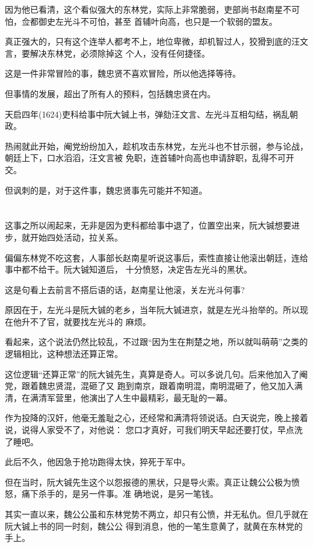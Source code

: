\documentclass[11pt,a4paper,onecolumn]{article}
\begin{document}
因为他已看清，这个看似强大的东林党，实际上非常脆弱，吏部尚书赵南星不可怕，佥都御史左光斗不可怕，甚至
首辅叶向高，也只是一个软弱的盟友。

真正强大的，只有这个连举人都考不上，地位卑微，却机智过人，狡猾到底的汪文言，要解决东林党，必须除掉这
个人，没有任何捷径。

这是一件非常冒险的事，魏忠贤不喜欢冒险，所以他选择等待。

但事情的发展，超出了所有人的预料，包括魏忠贤在内。

天启四年(1624)吏科给事中阮大铖上书，弹劾汪文言、左光斗互相勾结，祸乱朝政。

热闹就此开始，阉党纷纷加入，趁机攻击东林党，左光斗也不甘示弱，参与论战，朝廷上下，口水滔滔，汪文言被
免职，连首辅叶向高也申请辞职，乱得不可开交。

但讽刺的是，对于这件事，魏忠贤事先可能并不知道。

\section[\thesection]{}

这事之所以闹起来，无非是因为吏科都给事中退了，位置空出来，阮大铖想要进步，就开始四处活动，拉关系。

偏偏东林党不吃这套，人事部长赵南星听说这事后，索性直接让他滚出朝廷，连给事中都不给干。阮大铖知道后，
十分愤怒，决定告左光斗的黑状。

这是句看上去前言不搭后语的话，赵南星让他滚，关左光斗何事?

原因在于，左光斗是阮大铖的老乡，当年阮大铖进京，就是左光斗抬举的。所以现在他升不了官，就要找左光斗的
麻烦。

看起来，这个说法仍然比较乱，不过跟``因为生在荆楚之地，所以就叫萌萌''之类的逻辑相比，这种想法还算正常。

这位逻辑``还算正常''的阮大铖先生，真算是奇人。可以多说几句。后来他加入了阉党，跟着魏忠贤混，混砸了又
跑到南京，跟着南明混，南明混砸了，他又加入满清，在满清军营里，他演出了人生中最精彩，最无耻的一幕。

作为投降的汉奸，他毫无羞耻之心，还经常和满清将领说话。白天说完，晚上接着说，说得人家受不了，对他说：
您口才真好，可我们明天早起还要打仗，早点洗了睡吧。

此后不久，他因急于抢功跑得太快，猝死于军中。

但在当时，阮大铖先生这个以怨报德的黑状，只是导火索。真正让魏公公极为愤怒，痛下杀手的，是另一件事。准
确地说，是另一笔钱。

其实一直以来，魏公公虽和东林党势不两立，却只有公愤，并无私仇。但几乎就在阮大铖上书的同一时刻，魏公公
得到消息，他的一笔生意黄了，就黄在东林党的手上。
\end{document}
